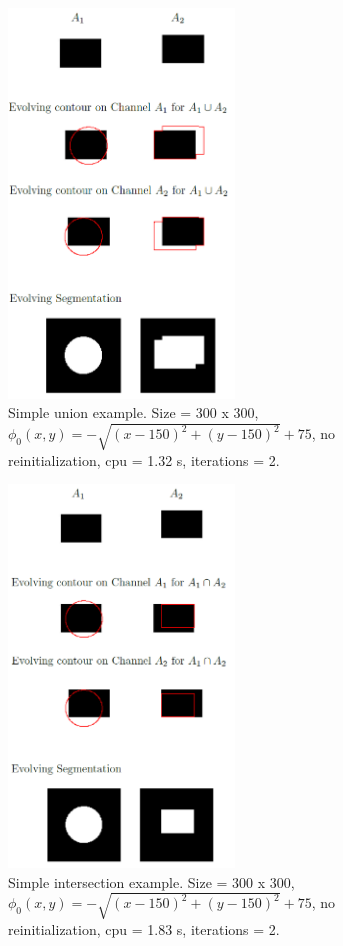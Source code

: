 \documentclass[10pt,twocolumn,letterpaper]{article}
\begin{document}
\begin{figure}[t!]
\centering
\includegraphics[width=6cm]{sc_unionsimple.png}
\caption{Simple union example. Size = 300 x 300, $\phi_{0}(x,y) = - \sqrt{(x - 150)^2 + (y - 150)^2} + 75$,  no reinitialization, cpu = 1.32 s, 
iterations = 2.}
\label{fig:sc_unionsimple}
\end{figure}

\begin{figure}[t!]
\centering
\includegraphics[width=6cm]{sc_intersectionsimple.png}
\caption{Simple intersection example. Size = 300 x 300, $\phi_{0}(x,y) = - \sqrt{(x - 150)^2 + (y - 150)^2} + 75$,  no reinitialization, cpu = 1.83 s, 
iterations = 2.}
\label{fig:sc_intersectionsimple}
\end{figure}
\end{document}

